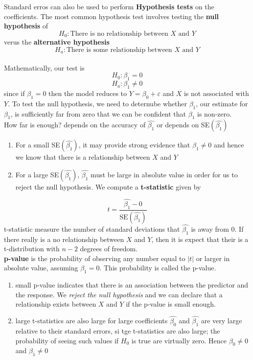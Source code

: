 \documentclass{article}
\begin{document}
\vspace{5mm}
Standard erros can also be used to perform \textbf{Hypothesis tests} on the coefficients. The most common hypothesis test involves testing the \textbf{null hypothesis} of
\begin{equation*} H_0: \text{There is no relationship between $X$ and $Y$} \end{equation*}
verus the \textbf{alternative hypothesis}
\begin{equation*} H_a: \text{There is some relationship between $X$ and $Y$} \end{equation*}
\\[2mm]
Mathematically, our test is 
\begin{equation*} H_0: \beta_1 = 0 \end{equation*}
\begin{equation*} H_a: \beta_1 \neq 0 \end{equation*}
since if $\beta_1 = 0$ then the model reduces to $Y = \beta_0 + \varepsilon$ and $X$ is not associated with $Y$. To test the null hypothesis, we need to deternube whether $\beta_1$, our estimate for $\beta_1$, is sufficiently far from zero that we can be confident that $\beta_1$ is non-zero. 
\\ How far is enough? depends on the accuracy of $\hat{\beta_1}$  or depends on SE$(\hat{\beta_1})$ 
\begin{enumerate}
    \item For a small SE$(\hat{\beta_1})$, it may provide strong evidence that $\beta_1 \neq 0$ and hence we know that there is a relationship between $X$ and $Y$ 
    \item For a large SE$(\hat{\beta_1})$, $\hat{\beta_1}$ must be large in absolute value in order for us to reject the null hypothesis. We compute a \textbf{t-statistic} given by 
\end{enumerate}
\begin{equation*} t = \frac{\hat{\beta_1} - 0}{\text{SE}(\hat{\beta_1})}  \end{equation*}
t-statistic measure the number of standard deviations that $\hat{\beta_1}$ is away from 0. If there really is a no relationship between $X$ and $Y$, then it is expect that their is a t-distribution with $n-2$ degrees of freedom. 
\\[4mm] \textbf{p-value} is the probability of observing any number equal to $|t|$ or larger in absolute value, assuming $\beta_1 = 0$. This probability is called the p-value. 
\begin{enumerate}
    \item small p-value indicates that there is an association between the predictor and the response. We \textit{reject the null hypothesis} and we can declare that a relationship exists between $X$ and $Y$ if the p-value is small enough.
    \item large t-statistics are also large for large coefficients $\hat{\beta_0}$ and $\hat{\beta_1}$ are very large relative to their standard errors, si tge t-statistics are also large; the probability of seeing such values if $H_0$ is true are virtually zero. Hence $\beta_0 \neq 0$ and $\beta_1 \neq 0$ 
\end{enumerate}
\newpage
\end{document}
